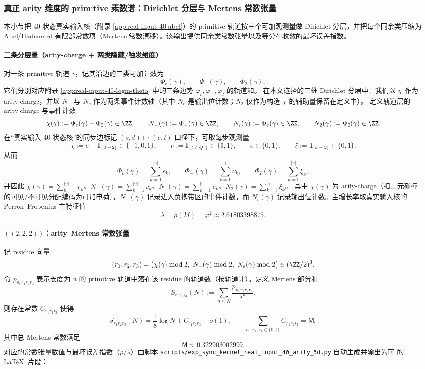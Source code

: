 \subsubsection{真正 arity 维度的 primitive 素数谱：Dirichlet 分层与 Mertens 常数张量}\label{subsec:arity-dirichlet-mertens-tensor}
本小节把 40 状态真实输入核（附录 \ref{app:real-input-40-abel}）的 primitive 轨道按三个可加观测量做 Dirichlet 分层，并把每个同余类压缩为 Abel/Hadamard 有限部常数项（Mertens 常数漂移）。该输出提供同余类常数张量以及等分布收敛的最坏误差指数。

\paragraph{三条分层量（arity-charge + 两类隐藏/触发维度）}
对一条 primitive 轨道 $\gamma$，记其沿边的三类可加计数为
$$
\Phi_e(\gamma),\qquad \Phi_-(\gamma),\qquad \Phi_2(\gamma),
$$
它们分别对应附录 \ref{app:real-input-40-logm-theta} 中的三条边势 $\varphi_e,\varphi_-,\varphi_2$ 的轨道和。
在本文选择的三维 Dirichlet 分层中，我们以 $\chi$ 作为 arity-charge，并以 $N_-$ 与 $N_e$ 作为两条事件计数轴（其中 $N_e$ 是输出位计数；$N_2$ 仅作为构造 $\chi$ 的辅助量保留在定义中）。
定义轨道层的 arity-charge 与事件计数
$$
\chi(\gamma):=\Phi_e(\gamma)-\Phi_2(\gamma)\in\ZZ,
\qquad
N_-(\gamma):=\Phi_-(\gamma)\in\ZZ,
\qquad
N_e(\gamma):=\Phi_e(\gamma)\in\ZZ,
\qquad
N_2(\gamma):=\Phi_2(\gamma)\in\ZZ.
$$
在“真实输入 40 状态核”的同步边标记 $(s,d)\mapsto(e,t)$ 口径下，可取每步观测量
$$
\chi:=e-\mathbf{1}_{\{d=2\}}\in\{-1,0,1\},
\qquad
\nu:=\mathbf{1}_{\{t\in Q_-\}}\in\{0,1\},
\qquad
e\in\{0,1\},
\qquad
\xi:=\mathbf{1}_{\{d=2\}}\in\{0,1\}.
$$
从而
$$
\Phi_e(\gamma)=\sum_{k=1}^{|\gamma|} e_k,
\qquad
\Phi_-(\gamma)=\sum_{k=1}^{|\gamma|} \nu_k,
\qquad
\Phi_2(\gamma)=\sum_{k=1}^{|\gamma|} \xi_k,
$$
并因此 $\chi(\gamma)=\sum_{k=1}^{|\gamma|}\chi_k$、$N_-(\gamma)=\sum_{k=1}^{|\gamma|}\nu_k$、$N_e(\gamma)=\sum_{k=1}^{|\gamma|}e_k$、$N_2(\gamma)=\sum_{k=1}^{|\gamma|}\xi_k$。
其中 $\chi(\gamma)$ 为 arity-charge（把二元碰撞的可见/不可见分配编码为可加电荷），$N_-(\gamma)$ 记录进入负携带区的事件计数，而 $N_e(\gamma)$ 记录输出位计数。主增长率取真实输入核的 Perron--Frobenius 主特征值
$$
\lambda=\rho(M)=\varphi^2\approx 2.61803398875.
$$

\paragraph{\texorpdfstring{$((2,2,2))$}{(2,2,2)}：arity--Mertens 常数张量}
记 residue 向量
$$
(r_1,r_2,r_3)=\bigl(\chi(\gamma)\bmod 2,\ N_-(\gamma)\bmod 2,\ N_e(\gamma)\bmod 2\bigr)\in(\ZZ/2)^3.
$$
令 $p_{n,r_1r_2r_3}$ 表示长度为 $n$ 的 primitive 轨道中落在该 residue 的轨道数（按轨道计）。定义 Mertens 部分和
$$
S_{r_1r_2r_3}(N):=\sum_{n\le N}\frac{p_{n,r_1r_2r_3}}{\lambda^n}.
$$
则存在常数 $C_{r_1r_2r_3}$ 使得
$$
S_{r_1r_2r_3}(N)=\frac{1}{8}\log N + C_{r_1r_2r_3}+o(1),
\qquad
\sum_{r_1,r_2,r_3\in\{0,1\}}C_{r_1r_2r_3}=\mathsf{M},
$$
其中总 Mertens 常数满足
$$
\mathsf{M}\approx 0.322903002999.
$$
对应的常数张量数值与最坏误差指数（$\rho/\lambda$）由脚本
\texttt{scripts/exp\_sync\_kernel\_real\_input\_40\_arity\_3d.py}
自动生成并输出为可 \verb|| 的 \LaTeX\ 片段：


